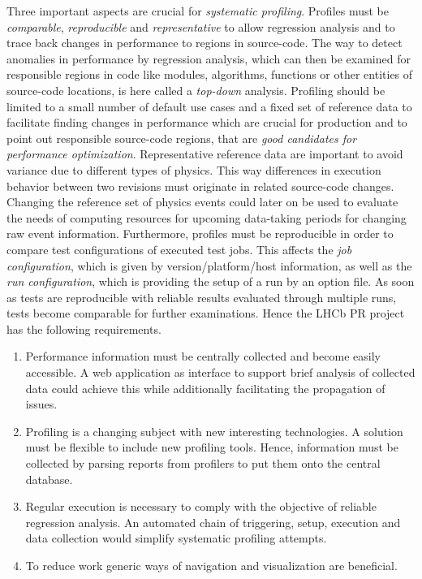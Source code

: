 \documentclass[a4paper]{jpconf}
\begin{document}
Three important aspects are crucial for \textit{systematic profiling}. Profiles must be \textit{comparable}, \textit{reproducible} and \textit{representative} to allow regression analysis and to trace back changes in performance to regions in source-code. The way to detect anomalies in performance by regression analysis, which can then be examined for responsible regions in code like modules, algorithms, functions or other entities of source-code locations, is here called a \textit{top-down} analysis.
\newline
Profiling should be limited to a small number of default use cases and a fixed set of reference data to facilitate finding changes in performance which are crucial for production and to point out responsible source-code regions, that are \textit{good candidates for performance optimization}. Representative reference data are important to avoid variance due to different types of physics. This way differences in execution behavior between two revisions must originate in related source-code changes. Changing the reference set of physics events could later on be used to evaluate the needs of computing resources for upcoming data-taking periods for changing raw event information.
\newline
Furthermore, profiles must be reproducible in order to compare test configurations of executed test jobs. This affects the \textit{job configuration}, which is given by version/platform/host information, as well as the \textit{run configuration}, which is providing the setup of a run by an option file. As soon as tests are reproducible with reliable results evaluated through multiple runs, tests become comparable for further examinations. 
\newline
Hence the LHCb PR project has the following requirements.
\begin{enumerate}
 \item Performance information must be centrally collected and become easily accessible. A web application as interface to support brief analysis of collected data could achieve this while additionally facilitating the propagation of issues.
 \item Profiling is a changing subject with new interesting technologies. A solution must be flexible to include new profiling tools. Hence, information must be collected by parsing reports from profilers to put them onto the central database.
 \item Regular execution is necessary to comply with the objective of reliable regression analysis. An automated chain of triggering, setup, execution and data collection would simplify systematic profiling attempts.
 \item To reduce work generic ways of navigation and visualization are beneficial.
\end{enumerate}
\end{document}
